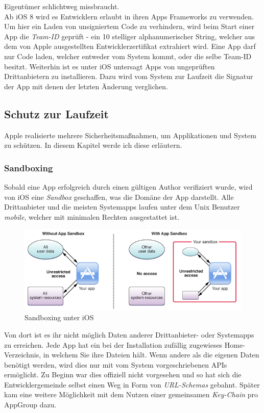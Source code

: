		Eigentümer schlichtweg missbraucht.\\
		Ab iOS 8 wird es Entwicklern erlaubt in ihren Apps Frameworks zu verwenden. Um
		hier ein Laden von unsigniertem Code zu verhindern, wird beim Start einer App
		die \textsl{Team-ID} geprüft - ein 10 stelliger alphanumerischer String,
		welcher aus dem von Apple ausgestellten Entwicklerzertifikat extrahiert wird.
		Eine App darf nur Code laden, welcher entweder vom System kommt, oder die selbe
		Team-ID besitzt. Weiterhin ist es unter iOS untersagt Apps von ungeprüften
		Drittanbietern zu installieren. Dazu wird vom System zur Laufzeit die
		Signatur der App mit denen der letzten Änderung verglichen.
		
	\subsection{Schutz zur Laufzeit}
		Apple realisierte mehrere Sicherheitsmaßnahmen, um Applikationen und System zu
		schützen. In diesem Kapitel werde ich diese erläutern.
		
		\subsubsection{Sandboxing} 
			Sobald eine App erfolgreich durch einen gültigen Author verifiziert wurde,
			wird von iOS eine \textsl{Sandbox} geschaffen, was die Domäne der App
			darstellt. Alle Drittanbieter und die meisten Systemapps laufen unter dem
			Unix Benutzer \textsl{mobile}, welcher mit minimalen Rechten ausgestattet
			ist.
			\begin{figure}[h]
				\centering
				\includegraphics[width=0.9\linewidth]{ios/media/sandboxing.png}
				\caption{Sandboxing unter iOS 
				\cite{IOSSandboxing}}
				\label{fig:sandboxing}
			\end{figure}
			Von dort ist es ihr nicht möglich Daten anderer Drittanbieter- oder
			Systemapps zu erreichen. Jede App hat ein bei der Installation zufällig
			zugewieses Home-Verzeichnis, in welchem Sie ihre Dateien hält. Wenn
			andere als die eigenen Daten benötigt werden, wird dies nur mit vom System
			vorgeschriebenen APIs ermöglicht. Zu Beginn war dies offiziell nicht
			vorgesehen und so hat sich die Entwicklergemeinde selbst einen Weg in Form von
			\textsl{URL-Schemas} gebahnt. Später kam eine weitere Möglichkeit mit dem
			Nutzen einer gemeinsamen \textsl{Key-Chain} pro AppGroup
			dazu\cite[S.83]{Banks2015}.
				
